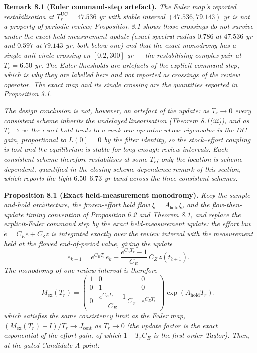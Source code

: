 \documentclass[11pt]{article}
\begin{document}
\textbf{Remark 8.1 (Euler command-step artefact).} \emph{The Euler map's
reported restabilisation at \(T_r^{\mathrm{UC}} = 47.536\) yr with
stable interval \((47.536, 79.143)\) yr is not a property of periodic
review; Proposition 8.1 shows those crossings do not survive under the
exact held-measurement update (exact spectral radius \(0.786\) at
\(47.536\) yr and \(0.597\) at \(79.143\) yr, both below one) and that
the exact monodromy has a single unit-circle crossing on \([0.2, 300]\)
yr --- the restabilising complex pair at \(T_r = 6.50\) yr. The Euler
thresholds are artefacts of the explicit command step, which is why they
are labelled here and not reported as crossings of the review operator.
The exact map and its single crossing are the quantities reported in
Proposition 8.1.}

\emph{The design conclusion is not, however, an artefact of the update:
as \(T_r \to 0\) every consistent scheme inherits the undelayed
linearisation (Theorem 8.1(iii)), and as \(T_r \to \infty\) the exact
hold tends to a rank-one operator whose eigenvalue is the DC gain,
proportional to \(L(0) = 0\) by the filter identity, so the
stock--effort coupling is lost and the equilibrium is stable for long
enough review intervals. Each consistent scheme therefore restabilises
at some \(T_r\); only the location is scheme-dependent, quantified in
the closing scheme-dependence remark of this section, which reports the
tight \(6.50\)--\(6.73\) yr band across the three consistent schemes.}

\textbf{Proposition 8.1 (Exact held-measurement monodromy).} \emph{Keep
the sample-and-hold architecture, the frozen-effort hold flow
\(\dot\xi = A_{\mathrm{hold}}\xi\), and the flow-then-update timing
convention of Proposition 6.2 and Theorem 8.1, and replace the
explicit-Euler command step by the exact held-measurement update: the
effort law \(\dot e = C_E e + C_Z z\) is integrated exactly over the
review interval with the measurement held at the flowed end-of-period
value, giving the update}
\[e_{k+1} = e^{C_E T_r} e_k + \frac{e^{C_E T_r} - 1}{C_E}\, C_Z\, z(t_{k+1}^-).\]
\emph{The monodromy of one review interval is therefore}
\[M_{\mathrm{ex}}(T_r) = \begin{pmatrix} 1 & 0 & 0 \\ 0 & 1 & 0 \\ 0 & \dfrac{e^{C_E T_r}-1}{C_E}\,C_Z & e^{C_E T_r} \end{pmatrix} \exp(A_{\mathrm{hold}} T_r), \tag{13}\]
\emph{which satisfies the same consistency limit as the Euler map,
\((M_{\mathrm{ex}}(T_r) - I)/T_r \to J_{\mathrm{cont}}\) as
\(T_r \to 0\) (the update factor is the exact exponential of the effort
gain, of which \(1 + T_r C_E\) is the first-order Taylor). Then, at the
gated Candidate A point:}
\end{document}
